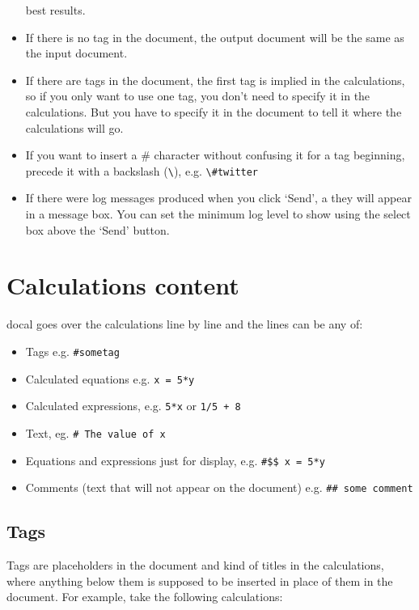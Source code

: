 \documentclass[12pt]{article}
\begin{document}
\begin{itemize}
        best results.
    \item If there is no tag in the document, the output document will be the
        same as the input document.
    \item If there are tags in the document, the first tag is implied in the
        calculations, so if you only want to use one tag, you don't need to
        specify it in the calculations. But you have to specify it in the
        document to tell it where the calculations will go.
    \item If you want to insert a \# character without confusing it for a tag
        beginning, precede it with a backslash (\verb|\|), e.g.
        \verb|\#twitter|
    \item If there were log messages produced when you click `Send', a they
        will appear in a message box. You can set the minimum log level to show
        using the select box above the `Send' button.
\end{itemize}

\section{Calculations content}

docal goes over the calculations line by line and the lines can be any of:

\begin{itemize}
    \setlength\itemsep{0pt}
    \item Tags e.g. \verb|#sometag|
    \item Calculated equations e.g. \verb|x = 5*y|
    \item Calculated expressions, e.g. \verb|5*x| or \verb|1/5 + 8|
    \item Text, eg. \verb|# The value of x|
    \item Equations and expressions just for display, e.g. \verb|#$$ x = 5*y|
    \item Comments (text that will not appear on the document) e.g.
        \verb|## some comment|
\end{itemize}

\subsection{Tags}

Tags are placeholders in the document and kind of titles in the calculations,
where anything below them is supposed to be inserted in place of them in the
document.  For example, take the following calculations:
\end{document}
